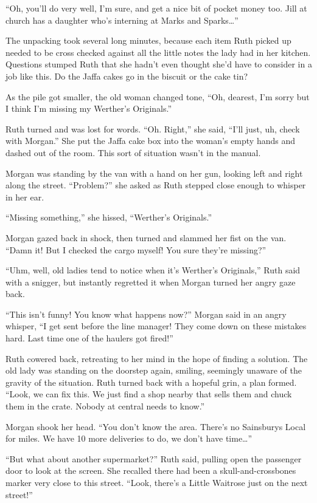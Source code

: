 “Oh, you’ll do very well, I’m sure, and get a nice bit of pocket money too. Jill at church has a daughter who’s interning at Marks and Sparks…”

The unpacking took several long minutes, because each item Ruth picked up needed to be cross checked against all the little notes the lady had in her kitchen. Questions stumped Ruth that she hadn’t even thought she’d have to consider in a job like this. Do the Jaffa cakes go in the biscuit or the cake tin? 

As the pile got smaller, the old woman changed tone, “Oh, dearest, I’m sorry but I think I’m missing my Werther's Originals.”

Ruth turned and was lost for words. “Oh. Right,” she said, “I’ll just, uh, check with Morgan.” She put the Jaffa cake box into the woman’s empty hands and dashed out of the room. This sort of situation wasn’t in the manual.

Morgan was standing by the van with a hand on her gun, looking left and right along the street. “Problem?” she asked as Ruth stepped close enough to whisper in her ear. 

“Missing something,” she hissed, “Werther's Originals.” 

Morgan gazed back in shock, then turned and slammed her fist on the van. “Damn it! But I checked the cargo myself! You sure they’re missing?”

“Uhm, well, old ladies tend to notice when it’s Werther's Originals,” Ruth said with a snigger, but instantly regretted it when Morgan turned her angry gaze back.

“This isn’t funny! You know what happens now?” Morgan said in an angry whisper, “I get sent before the line manager! They come down on these mistakes hard. Last time one of the haulers got fired!”

Ruth cowered back, retreating to her mind in the hope of finding a solution. The old lady was standing on the doorstep again, smiling, seemingly unaware of the gravity of the situation. Ruth turned back with a hopeful grin, a plan formed. “Look, we can fix this. We just find a shop nearby that sells them and chuck them in the crate. Nobody at central needs to know.”

Morgan shook her head. “You don’t know the area. There’s no Sainsburys Local for miles. We have 10 more deliveries to do, we don’t have time…”

“But what about another supermarket?” Ruth said, pulling open the passenger door to look at the screen. She recalled there had been a skull-and-crossbones marker very close to this street. “Look, there’s a Little Waitrose just on the next street!”

